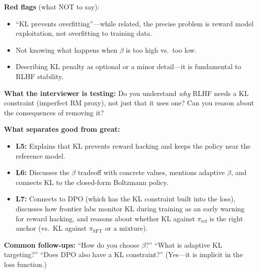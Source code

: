 \begin{interviewq}
\textbf{Red flags} (what NOT to say):
\begin{itemize}
    \item ``KL prevents overfitting''---while related, the precise problem is reward model exploitation, not overfitting to training data.
    \item Not knowing what happens when $\beta$ is too high vs.\ too low.
    \item Describing KL penalty as optional or a minor detail---it is fundamental to RLHF stability.
\end{itemize}

\textbf{What the interviewer is testing:} Do you understand \textit{why} RLHF needs a KL constraint (imperfect RM proxy), not just that it uses one? Can you reason about the consequences of removing it?

\textbf{What separates good from great:}
\begin{itemize}
    \item \textbf{L5:} Explains that KL prevents reward hacking and keeps the policy near the reference model.
    \item \textbf{L6:} Discusses the $\beta$ tradeoff with concrete values, mentions adaptive $\beta$, and connects KL to the closed-form Boltzmann policy.
    \item \textbf{L7:} Connects to DPO (which has the KL constraint built into the loss), discusses how frontier labs monitor KL during training as an early warning for reward hacking, and reasons about whether KL against $\pi_{\text{ref}}$ is the right anchor (vs.\ KL against $\pi_{\text{SFT}}$ or a mixture).
\end{itemize}

\textbf{Common follow-ups:} ``How do you choose $\beta$?'' ``What is adaptive KL targeting?'' ``Does DPO also have a KL constraint?'' (Yes---it is implicit in the loss function.)
\end{interviewq}


